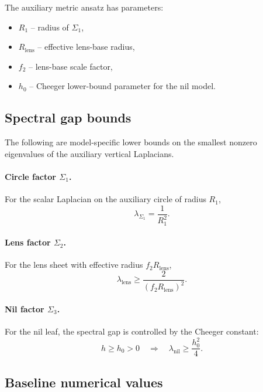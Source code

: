\documentclass[11pt]{article}
\begin{document}
The auxiliary metric ansatz has parameters:
\begin{itemize}
\item $R_1$ -- radius of $\Sigma_1$,
\item $R_{\mathrm{lens}}$ -- effective lens-base radius,
\item $f_2$ -- lens-base scale factor,
\item $h_0$ -- Cheeger lower-bound parameter for the nil model.
\end{itemize}

\subsection{Spectral gap bounds}

The following are model-specific lower bounds on the smallest nonzero
eigenvalues of the auxiliary vertical Laplacians.

\paragraph{Circle factor $\Sigma_1$.}
For the scalar Laplacian on the auxiliary circle of radius $R_1$,
\begin{equation}
\lambda_{\Sigma_1} = \frac{1}{R_1^2}.
\label{eq:gapSigma1}
\end{equation}

\paragraph{Lens factor $\Sigma_2$.}
For the lens sheet with effective radius $f_2R_{\mathrm{lens}}$,
\begin{equation}
\lambda_{\mathrm{lens}} \ge \frac{2}{(f_2R_{\mathrm{lens}})^2}.
\label{eq:gapLens}
\end{equation}

\paragraph{Nil factor $\Sigma_3$.}
For the nil leaf, the spectral gap is controlled by the Cheeger constant:
\begin{equation}
h \ge h_0 > 0
\quad\Rightarrow\quad
\lambda_{\mathrm{nil}} \ge \frac{h_0^2}{4}.
\label{eq:gapNil}
\end{equation}

\subsection{Baseline numerical values}
\end{document}
